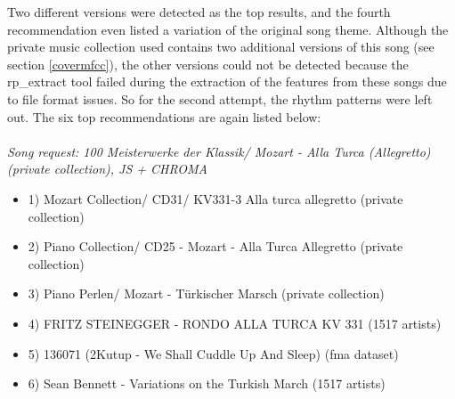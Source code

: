 \noindent Two different versions were detected as the top results, and the fourth recommendation even listed a variation of the original song theme. Although the private music collection used contains two additional versions of this song (see section \ref{covermfcc}), the other versions could not be detected because the rp\_extract tool failed during the extraction of the features from these songs due to file format issues. So for the second attempt, the rhythm patterns were left out. The six top recommendations are again listed below:\\
\ \\
\textit{\noindent Song request: 100 Meisterwerke der Klassik/ Mozart - Alla Turca (Allegretto) (private collection), JS + CHROMA}

\begin{itemize}
	\setlength\itemsep{-0.5em}
	\item 1) Mozart Collection/ CD31/ KV331-3 Alla turca allegretto (private collection)
	\item 2) Piano Collection/ CD25 - Mozart - Alla Turca Allegretto (private collection)
	\item 3) Piano Perlen/ Mozart - Türkischer Marsch (private collection)
	\item 4) FRITZ STEINEGGER - RONDO ALLA TURCA KV 331 (1517 artists)
	\item 5) 136071 (2Kutup - We Shall Cuddle Up And Sleep) (fma dataset) 
	\item 6) Sean Bennett - Variations on the Turkish March (1517 artists)
\end{itemize}

